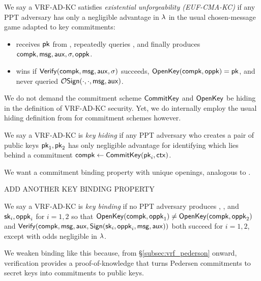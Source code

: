 \begin{definition}
We say a VRF-AD-KC satisfies {\em existential unforgeability (EUF-CMA-KC)} if
any PPT adversary \adv has only a negligible advantage in $\lambda$
in the usual chosen-message game adapted to key commitments:
\begin{itemize}
 \item \adv receives $\mathsf{pk}$ from , %
 repeatedly queries ,
  and finally produces $\mathsf{compk},\mathsf{msg},\mathsf{aux},\sigma,\mathsf{oppk}$.
 \item \adv wins if ${\mathsf{Verify}}(\mathsf{compk},\mathsf{msg},\mathsf{aux},\sigma)$ succeeds,
  ${\mathsf{OpenKey}}(\mathsf{compk},\mathsf{oppk}) = \mathsf{pk}$, and
   \adv never queried $\mathcal{O}\mathsf{Sign}(\cdot,\cdot,\mathsf{msg},\mathsf{aux})$.
\end{itemize}
\end{definition}

We do not demand the commitment scheme ${\mathsf{CommitKey}}$ and ${\mathsf{OpenKey}}$
be hiding in the definition of VRF-AD-KC security.
Yet, we do internally employ the usual hiding definition from
\cite[pp.8]{cryptoeprint:2019:1185} for commitment schemes however.

\begin{definition}
We say a VRF-AD-KC is {\em key hiding} if any PPT adversary \adv
who creates a pair of public keys $\mathsf{pk}_1,\mathsf{pk}_2$
has only negligible advantage for identifying which lies behind a commitment
 $\mathsf{compk} \leftarrow {\ensuremath{\mathsf{CommitKey}}}(\mathsf{pk}_i,\mathsf{ctx})$.
\end{definition}

We want a commitment binding property with unique openings,
analogous to \cite[pp.9]{cryptoeprint:2019:1185}.

ADD ANOTHER KEY BINDING PROPERTY

\begin{definition}\label{def:vrf_key_binding}
We say a VRF-AD-KC is {\em key binding} if no PPT adversary \adv
produces \compk, \msg, \aux and $\mathsf{sk}_i,\mathsf{oppk}_i$ for $i=1,2$
so that
 ${\mathsf{OpenKey}}(\mathsf{compk},\mathsf{oppk}_1) \ne {\ensuremath{\mathsf{OpenKey}}}(\mathsf{compk},\mathsf{oppk}_2)$ and
 ${\mathsf{Verify}}(\mathsf{compk},\mathsf{msg},\mathsf{aux},{\mathsf{Sign}}(\mathsf{sk}_i,\mathsf{oppk}_i,\mathsf{msg},\mathsf{aux}))$
both succeed for $i=1,2$, except with odds negligible in $\lambda$.
\end{definition}

We weaken binding like this because, from \S\ref{subsec:vrf_pederson}
onward, verification provides a proof-of-knowledge that turns
Pedersen commitments to secret keys into commitments to public keys.

